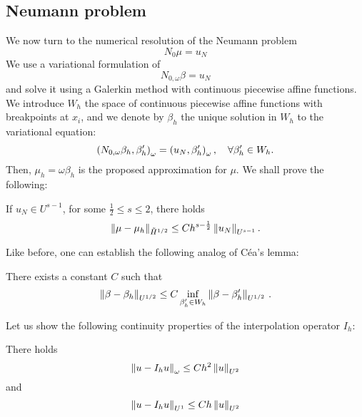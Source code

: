 \documentclass[a4paper]{article}
\begin{document}
\subsection{Neumann problem}

We now turn to the numerical resolution of the Neumann problem
\[N_0 \mu = u_N\] 
We use a variational formulation of  
\[N_{0,\omega} \beta = u_N\]
and solve it using a Galerkin method with continuous piecewise affine functions. We introduce $W_h$ the space of continuous piecewise affine functions with breakpoints at $x_i$, and we denote by $\beta_h$ the unique solution in $W_h$ to the variational equation:
\begin{equation}
\left( N_{0,\omega} \beta_h,\beta_h'\right)_{\omega} = \left( u_N,\beta_h'\right)_{\omega}, \quad \forall \beta_h' \in W_h.
\label{NomegaBetaGalerk}
\end{equation}
Then, $\mu_h = \omega \beta_h$ is the proposed approximation for $\mu$. 
We shall prove the following:
\begin{The}
	If $u_N \in U^{s-1}$, for some $\frac{1}{2} \leq s \leq 2$, there holds 
	\[\left\|\mu - \mu_h\right\|_{\tilde{H}^{1/2}} \leq C h^{s - \frac{1}{2}}\left\|u_N\right\|_{U^{s-1}}.\]
	\label{theOrdreCVNeumann}
\end{The}
\noindent Like before, one can establish the following analog of Céa's lemma:
\begin{Lem}
	There exists a constant $C$ such that
	\[\left\|\beta - \beta_h\right\|_{U^{1/2}} \leq C \inf_{\beta'_h \in W_h} \left\|\beta - \beta'_h\right\|_{U^{1/2}}\,.\] 
	\label{CeaNeumann}
\end{Lem}
\noindent Let us show the following continuity properties of the interpolation operator $I_h$: 
\begin{Lem} 
	\label{U0U2,U1U2}
	There holds 
	\[ \left\| u - I_h u\right\|_{\omega} \leq Ch^2\left\|u\right\|_{U^2}\]
	and
	\[\left\|u-I_h u\right\|_{U^1} \leq Ch \left\|u\right\|_{U^2}\]	
\end{Lem}
\end{document}
